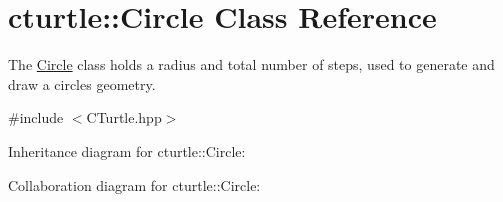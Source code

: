 \hypertarget{classcturtle_1_1Circle}{}\section{cturtle\+:\+:Circle Class Reference}
\label{classcturtle_1_1Circle}


The \hyperlink{classcturtle_1_1Circle}{Circle} class holds a radius and total number of steps, used to generate and draw a circles geometry.  




{\ttfamily \#include $<$C\+Turtle.\+hpp$>$}



Inheritance diagram for cturtle\+:\+:Circle\+:


Collaboration diagram for cturtle\+:\+:Circle\+:

